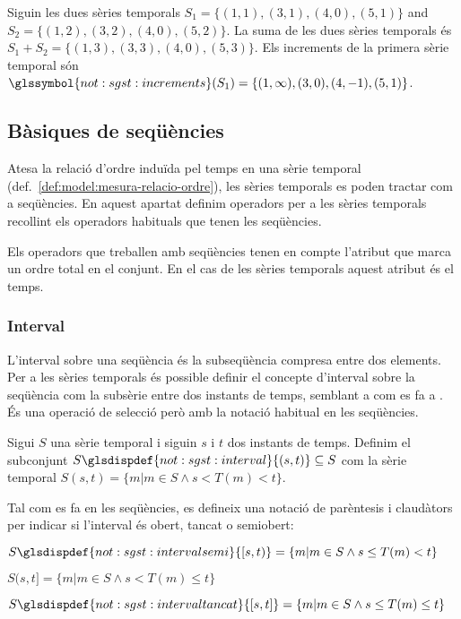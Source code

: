 \begin{example}
  Siguin les dues sèries temporals $S_1=\{(1,1),(3,1),(4,0),(5,1)\}$
  and $S_2=\{(1,2),(3,2),(4,0),(5,2)\}$. %
  La suma de les dues sèries temporals és
  $S_1+S_2=\{(1,3),(3,3),(4,0),(5,3)\}$. %
  Els increments de la primera sèrie temporal són
  $\glssymbol{not:sgst:increments}(S_1)=\{(1,\infty),(3,0),(4,-1),(5,1)\}$.
\end{example}




\subsection{Bàsiques de seqüències}


Atesa la relació d'ordre induïda pel temps en una sèrie temporal
(def.\ \ref{def:model:mesura-relacio-ordre}), les sèries temporals es
poden tractar com a seqüències.  En aquest apartat definim operadors
per a les sèries temporals recollint els operadors habituals que tenen
les seqüències. 

Els operadors que treballen amb seqüències tenen en compte l'atribut
que marca un ordre total en el conjunt. En el cas de les sèries
temporals aquest atribut és el temps.



\subsubsection{Interval}

L'interval sobre una seqüència és la subseqüència compresa entre dos
elements.  Per a les sèries temporals és possible definir el concepte
d'interval sobre la seqüència com la subsèrie entre dos instants de
temps, semblant a com es fa a \cite{last:keogh,last:hetland}.  És una
operació de selecció però amb la notació habitual en les seqüències.


\begin{definition}[Interval]
  \label{def:model:st-interval}
  Sigui $S$ una sèrie temporal i siguin $s$ i $t$
  dos instants de temps. Definim el subconjunt
  $S\glsdispdef{not:sgst:interval}{(s,t)} \subseteq S$ com la sèrie
  temporal $S(s,t)=\{m| m\in S \wedge s<T(m)<t\}$.

  Tal com es fa en les seqüències, es defineix una notació de
  parèntesis i claudàtors per indicar si l'interval és obert, tancat o
  semiobert:

  $S\glsdispdef{not:sgst:intervalsemi}{[s,t)}=\{m | m\in S  \wedge s\leq T(m)< t\}$

  $S(s,t]=\{m| m\in S  \wedge s<T(m)\leq t\}$

  $S\glsdispdef{not:sgst:intervaltancat}{[s,t]}=\{m | m\in S \wedge s\leq
  T(m)\leq t\}$
\end{definition}


